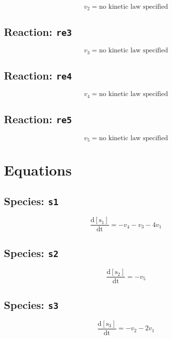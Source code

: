 \documentclass[11pt,a4paper]{scrartcl}
\begin{document}
\begin{equation}
v_{2}=\text{no kinetic law specified}
\end{equation}
\subsection{Reaction: \texttt{re3}}

\begin{equation}
v_{3}=\text{no kinetic law specified}
\end{equation}
\subsection{Reaction: \texttt{re4}}

\begin{equation}
v_{4}=\text{no kinetic law specified}
\end{equation}
\subsection{Reaction: \texttt{re5}}

\begin{equation}
v_{5}=\text{no kinetic law specified}
\end{equation}

\section{Equations}\subsection{Species: \texttt{s1}}
\begin{equation}
\frac{\mathrm{d[s_1]}}{\mathrm {dt}}= -v_{4}-v_{3}-4v_{1}
\end{equation}
\subsection{Species: \texttt{s2}}
\begin{equation}
\frac{\mathrm{d[s_2]}}{\mathrm {dt}}= -v_{5}
\end{equation}
\subsection{Species: \texttt{s3}}
\begin{equation}
\frac{\mathrm{d[s_3]}}{\mathrm {dt}}= -v_{2}-2v_{1}
\end{equation}
\end{document}
